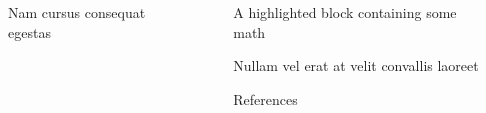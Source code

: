 \documentclass[final]{beamer}
\newlength{\sepwidth}
\newlength{\colwidth}
\newcommand{\separatorcolumn}{\begin{column}{\sepwidth}\end{column}}
\begin{document}
\begin{frame}[t]
\begin{columns}[t]
\begin{column}{\colwidth}
  \begin{block}{Nam cursus consequat egestas}

  \end{block}

\end{column}

\separatorcolumn

\begin{column}{\colwidth}

  \begin{exampleblock}{A highlighted block containing some math}

    

    


    

  \end{exampleblock}

  \begin{block}{Nullam vel erat at velit convallis laoreet}

    


    

  \end{block}

  \begin{block}{References}

    \nocite{*}
    \footnotesize{}

  \end{block}

\end{column}

\separatorcolumn
\end{columns}
\end{frame}
\end{document}
